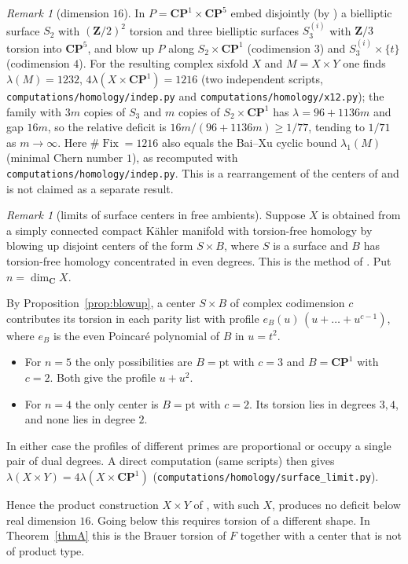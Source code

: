 \documentclass[11pt]{amsart}
\numberwithin{equation}{section}
\theoremstyle{definition}
\theoremstyle{remark}
\newtheorem{remark}[theorem]{Remark}
\newcommand{\CP}{\mathbf{CP}}
\newcommand{\Z}{\mathbf Z}
\newcommand{\C}{\mathbf C}
\DeclareMathOperator{\Fix}{Fix}
\begin{document}
\begin{remark}[dimension $16$]\label{rem:dim16}
In $P=\CP^1\times\CP^5$ embed disjointly (by
\cite[Lemma~3.2]{OpenAI22}) a bielliptic surface $S_2$ with $(\Z/2)^2$
torsion and three bielliptic surfaces $S_3^{(i)}$ with $\Z/3$ torsion
into $\CP^5$, and blow up $P$ along $S_2\times\CP^1$ (codimension $3$) and
$S_3^{(i)}\times\{t\}$ (codimension $4$). For the resulting complex sixfold $X$ and
$M=X\times Y$ one finds $\lambda(M)=1232$, $4\lambda(X\times\CP^1)=1216$
(two independent scripts, \nolinkurl{computations/homology/indep.py} and
\nolinkurl{computations/homology/x12.py}); the
family with $3m$ copies of $S_3$ and $m$ copies of $S_2\times\CP^1$ has
$\lambda=96+1136m$ and gap $16m$, so the relative deficit is
$16m/(96+1136m)\ge 1/77$, tending to $1/71$ as $m\to\infty$. Here $\#\Fix=1216$ also equals the Bai--Xu cyclic bound
$\lambda_1(M)$ (minimal Chern number $1$), as recomputed with
\nolinkurl{computations/homology/indep.py}. This is a rearrangement of the centers of
\cite{OpenAI22} and is not claimed as a separate result.
\end{remark}

\begin{remark}[limits of surface centers in free ambients]\label{rem:surfacelimit}
Suppose $X$ is obtained from a simply connected compact K\"ahler manifold
with torsion-free homology by blowing up disjoint centers of the form
$S\times B$, where $S$ is a surface and $B$ has torsion-free homology
concentrated in even degrees. This is the method of \cite{OpenAI22}. Put
$n=\dim_\C X$.

By Proposition~\ref{prop:blowup}, a center $S\times B$ of complex
codimension $c$ contributes its torsion in each parity list with profile
$e_B(u)\,(u+\dots+u^{c-1})$, where $e_B$ is the even Poincar\'e polynomial
of $B$ in $u=t^2$.
\begin{itemize}
\item For $n=5$ the only possibilities are $B=\mathrm{pt}$ with $c=3$ and
  $B=\CP^1$ with $c=2$. Both give the profile $u+u^2$.
\item For $n=4$ the only center is $B=\mathrm{pt}$ with $c=2$. Its torsion
  lies in degrees $3,4$, and none lies in degree $2$.
\end{itemize}
In either case the profiles of different primes are proportional or
occupy a single pair of dual degrees. A direct computation (same scripts)
then gives $\lambda(X\times Y)=4\lambda(X\times\CP^1)$
(\nolinkurl{computations/homology/surface_limit.py}).

Hence the product construction $X\times Y$ of \cite{OpenAI22}, with such
$X$, produces no deficit below real dimension $16$. Going below this
requires torsion of a different shape. In Theorem~\ref{thmA} this is the
Brauer torsion of $F$ together with a center that is not of product type.
\end{remark}
\end{document}
